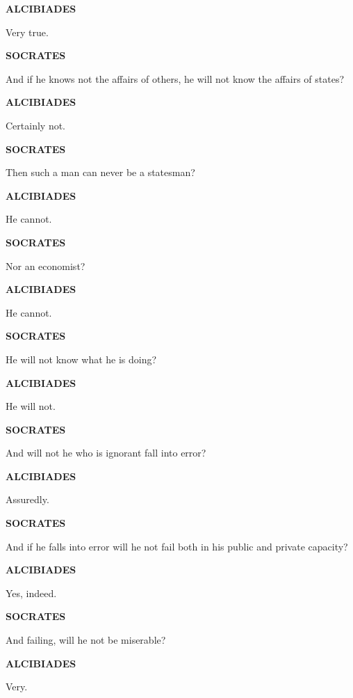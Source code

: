 \documentclass[11pt,letter]{article}
\begin{document}
\par \textbf{ALCIBIADES}
\par   Very true.

\par \textbf{SOCRATES}
\par   And if he knows not the affairs of others, he will not know the affairs of states?

\par \textbf{ALCIBIADES}
\par   Certainly not.

\par \textbf{SOCRATES}
\par   Then such a man can never be a statesman?

\par \textbf{ALCIBIADES}
\par   He cannot.

\par \textbf{SOCRATES}
\par   Nor an economist?

\par \textbf{ALCIBIADES}
\par   He cannot.

\par \textbf{SOCRATES}
\par   He will not know what he is doing?

\par \textbf{ALCIBIADES}
\par   He will not.

\par \textbf{SOCRATES}
\par   And will not he who is ignorant fall into error?

\par \textbf{ALCIBIADES}
\par   Assuredly.

\par \textbf{SOCRATES}
\par   And if he falls into error will he not fail both in his public and private capacity?

\par \textbf{ALCIBIADES}
\par   Yes, indeed.

\par \textbf{SOCRATES}
\par   And failing, will he not be miserable?

\par \textbf{ALCIBIADES}
\par   Very.
\end{document}
